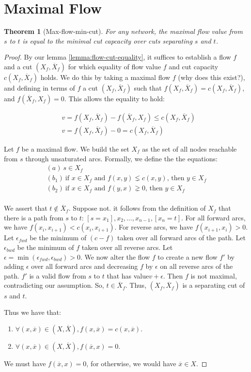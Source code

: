 \documentclass[titlepage]{article}
\newcommand{\eps}{\ensuremath{\epsilon}}
\newcommand{\Xbar}{\ensuremath{\overline{X}}}
\newcommand{\xbar}{\ensuremath{\overline{x}}}
\theoremstyle{plain}
\newtheorem{theorem}{Theorem}
\theoremstyle{definition}
\theoremstyle{remark}
\begin{document}
\section{Maximal Flow}
\begin{theorem}[Max-flow-min-cut]
    For any network, the maximal flow value from $s$ to $t$ is equal to the 
    minimal cut capcacity over cuts separating $s$ and $t$.
\end{theorem}
\begin{proof}
By our lemma \ref{lemma:flow-cut-equality}, it suffices to establish
a flow $f$ and a cut $(X_f, \Xbar_f)$ for which equality of
flow value $f$ and cut capacity $c(X_f, \Xbar_f)$ holds. We do this
by taking a maximal flow $f$ (why does this exist?), and defining
in terms of $f$ a cut $(X_f, \Xbar_f)$ such that $f(X_f, \Xbar_f) = c(X_f, \Xbar_f)$,
and $f(\Xbar_f, X_f) = 0$. This allows the equality to hold:

\begin{align*}
&v = f(X_f, \Xbar_f) - f(\Xbar_f, X_f) \leq c(X_f, \Xbar_f) \\
&v = f(X_f, \Xbar_f) - 0 = c(X_f, \Xbar_f)
\end{align*}

Let $f$ be a maximal flow. We build the set $X_f$ as the set of all nodes
reachable from $s$ through unsaturated arcs. Formally, we define the
the equations:
\begin{align*}
    &(a) ~ s \in X_f \\
    &(b_1) ~ \text{if $x \in X_f$ and $f(x, y) \lneq c(x, y)$, then $y \in X_f$ } \\
    &(b_2) ~ \text{if $x \in X_f$ and $f(y, x) \gneq 0$, then $y \in X_f$ } \\
\end{align*}

We assert that $t \not \in \Xbar_f$. Suppose not. it follows from the definition of $X_f$
that there is a path from $s$ to $t$: $[s = x_1], x_2, \dots, x_{n-1}, [x_n = t]$.
For all forward arcs, we have $f(x_i, x_{i+1}) < c(x_i, x_{i+1})$. For reverse
arcs, we have $f(x_{i+1}, x_i) > 0$. Let $\eps_{fwd}$ be the minimum of 
$(c - f)$ taken over all forward arcs of the path. Let $\eps_{bwd}$ be the
minimum of $f$ taken over all reverse arcs. Let $\eps = \min(\eps_{fwd}, \eps_{bwd}) > 0$.
We now alter the flow $f$ to create a new flow $f'$ by adding $\eps$ over all forward arcs and decreasing
$f$ by $\eps$ on all reverse arcs of the path. $f'$ is a valid
flow from $s$ to $t$ that has value$v + \epsilon$. Then $f$ is not maximal,
contradicting our assumption. So, $t \in \Xbar_f$. Thus, $(X_f, \Xbar_f)$ is
a separating cut of $s$ and $t$.


Thus we have that:
\begin{enumerate}
\item $\forall (x, \xbar) \in (X, \Xbar), f(x, \xbar) = c(x, \xbar)$.
\item $\forall (x, \xbar) \in (X, \Xbar), f(\xbar, x) = 0$.
\end{enumerate}

We must have $f(\xbar, x) = 0$, for otherwise, we would have $\xbar \in X$.
\end{proof}
\end{document}
